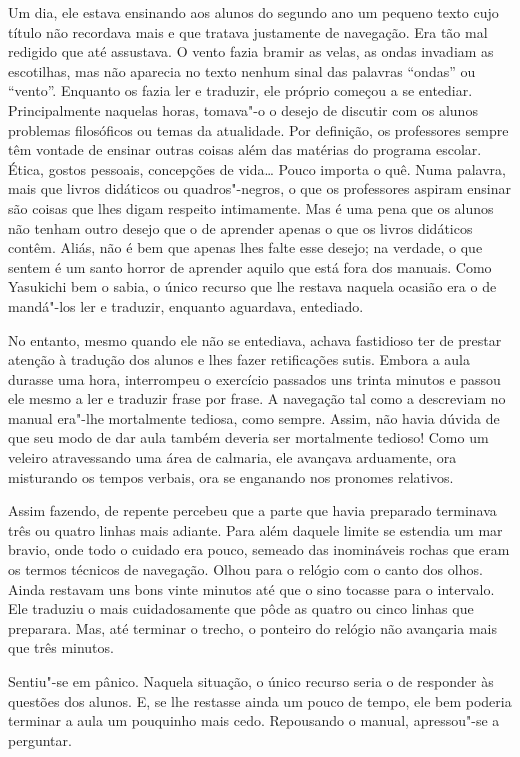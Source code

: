 Um dia, ele estava ensinando aos alunos do segundo ano um pequeno texto
cujo título não recordava mais e que tratava justamente de navegação.
Era tão mal redigido que até assustava. O vento fazia bramir as velas,
as ondas invadiam as escotilhas, mas não aparecia no texto nenhum sinal
das palavras ``ondas'' ou ``vento''. Enquanto os fazia ler e traduzir, ele
próprio começou a se entediar. Principalmente naquelas horas, tomava"-o
o desejo de discutir com os alunos problemas filosóficos ou temas da
atualidade. Por definição, os professores sempre têm vontade de ensinar
outras coisas além das matérias do programa escolar. Ética, gostos
pessoais, concepções de vida\ldots{} Pouco importa o quê. Numa palavra, mais
que livros didáticos ou quadros"-negros, o que os professores aspiram
ensinar são coisas que lhes digam respeito intimamente. Mas é uma pena
que os alunos não tenham outro desejo que o de aprender apenas o que os
livros didáticos contêm. Aliás, não é bem que apenas lhes falte esse
desejo; na verdade, o que sentem é um santo horror de aprender aquilo
que está fora dos manuais. Como Yasukichi bem o sabia, o único recurso
que lhe restava naquela ocasião era o de mandá"-los ler e traduzir,
enquanto aguardava, entediado.

No entanto, mesmo quando ele não se entediava, achava fastidioso ter de
prestar atenção à tradução dos alunos e lhes fazer retificações sutis.
Embora a aula durasse uma hora, interrompeu o exercício passados uns
trinta minutos e passou ele mesmo a ler e traduzir frase por frase. A
navegação tal como a descreviam no manual era"-lhe mortalmente tediosa,
como sempre. Assim, não havia dúvida de que seu modo de dar aula também
deveria ser mortalmente tedioso! Como um veleiro atravessando uma área
de calmaria, ele avançava arduamente, ora misturando os tempos verbais,
ora se enganando nos pronomes relativos.

Assim fazendo, de repente percebeu que a parte que havia preparado
terminava três ou quatro linhas mais adiante. Para além daquele limite
se estendia um mar bravio, onde todo o cuidado era pouco, semeado das
inomináveis rochas que eram os termos técnicos de navegação. Olhou para
o relógio com o canto dos olhos. Ainda restavam uns bons vinte minutos
até que o sino tocasse para o intervalo. Ele traduziu o mais
cuidadosamente que pôde as quatro ou cinco linhas que preparara. Mas,
até terminar o trecho, o ponteiro do relógio não avançaria mais que
três minutos.

Sentiu"-se em pânico. Naquela situação, o único recurso seria o de
responder às questões dos alunos. E, se lhe restasse ainda um pouco de
tempo, ele bem poderia terminar a aula um pouquinho mais cedo.
Repousando o manual, apressou"-se a perguntar.


